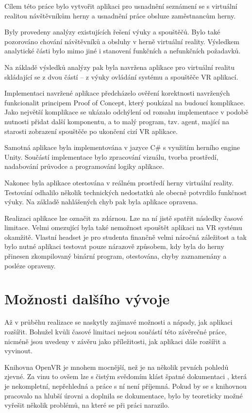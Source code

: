Cílem této práce bylo vytvořit aplikaci pro usnadnění seznámení se s
virtuální realitou návštěvníkům herny a usnadnění práce obsluze zaměstnancům herny.

Byly provedeny analýzy existujících řešení výuky a spouštěčů. Bylo také
pozorováno chování návštěvníků a obsluhy v herně virtuální reality.
Výsledkem analytické části bylo mimo jiné i stanovení funkčních a
nefunkčních požadavků.

Na základě výsledků analýzy pak byla navržena aplikace pro virtuální
realitu skládající se z dvou částí -- z výuky ovládání systému a
spouštěče VR aplikací.

Implementaci navržené aplikace předcházelo ověření korektnosti
navržených funkcionalit principem Proof of Concept, který poukázal na
budoucí komplikace. Jako největší komplikace se ukázalo odchýlení od
rozsahu implementace v podobě nutnosti přidat další komponentu, a to
malý program, tzv. agent, mající na starosti zobrazení spouštěče po
ukončení cizí VR aplikace.

Samotná aplikace byla implementována v jazyce C\# s využitím herního
engine Unity. Součástí implementace bylo zpracování vizuálu, tvorba
prostředí, nadabování průvodce a programování logiky aplikace.

Nakonec byla aplikace otestována v reálném prostředí herny virtuální
reality. Testování odhalilo několik technických nedostatků ale obecně
potvrdilo funkčnost výuky. Na základě nahlášených chyb pak byla aplikace
opravena.

Realizaci aplikace lze označit za zdárnou. Lze na ní jistě spatřit
následky časové limitace. Velmi omezující byla také nemožnost spouštět
aplikaci na VR systému okamžitě. Vlastní headset je pro studenta
finančně velmi náročná záležitost a tak bylo nutné aplikaci testovat
pouze nárazově způsobem, kdy byla do herny přinesen zkompilovaný
binární program, otestována, chyby zaznamenány a posléze opraveny.

\section{Možnosti dalšího
vývoje}\label{moux17enosti-dalux161uxedho-vuxfdvoje}

Až v průběhu realizace se naskytly zajímavé možnosti a nápady, jak
aplikaci rozšířit. Bohužel kvůli časové limitaci nejsou součástí této
závěrečné práce, nicméně jsou uvedeny v závěru jako příležitosti, jak
aplikaci dále rozšířit a vyvinout.

Knihovna OpenVR je mnohem mocnější, než je na několik prvních pohledů
zjevné. Za vinu to ovšem lze s čistým svědomím klást špatné dokumentaci \autocite{openvrdocs},
která je nekompletní, nepřehledná a práce s ní není příjemná. Pokud by
se s knihovnou pracovalo na hlubší úrovni a doplnila se dokumentace,
bylo by teoreticky možné vyřešit několik problémů, na které se při práci narazilo.


